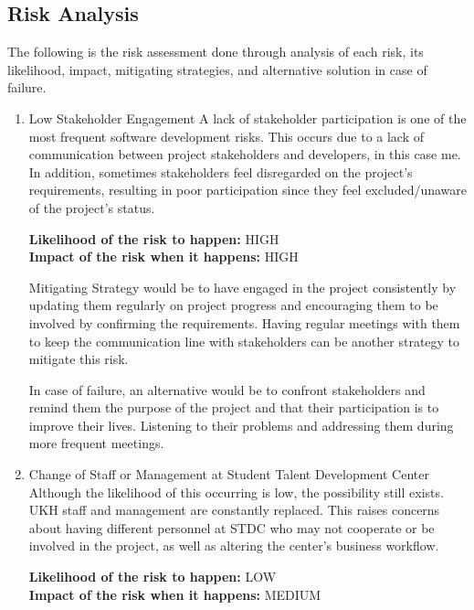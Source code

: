 \subsection{Risk Analysis}
\begin{justify}
The following is the risk assessment done through analysis of each risk, its likelihood, impact, mitigating strategies, and alternative solution in case of failure.

\begin{enumerate}
    \item Low Stakeholder Engagement
    \newendline A lack of stakeholder participation is one of the most frequent software development risks. This occurs due to a lack of communication between project stakeholders and developers, in this case me. In addition, sometimes stakeholders feel disregarded on the project's requirements, resulting in poor participation since they feel excluded/unaware of the project's status.

    \newendline \textbf{\textcolor{vin}{Likelihood of the risk to happen:}} HIGH\\
    \textbf{\textcolor{vin}{Impact of the risk when it happens:}} HIGH

    \newendline Mitigating Strategy would be to have engaged in the project consistently by updating them regularly on project progress and encouraging them to be involved by confirming the requirements. Having regular meetings with them to keep the communication line with stakeholders can be another strategy to mitigate this risk.

    \newendline In case of failure, an alternative would be to confront stakeholders and remind them the purpose of the project and that their participation is to improve their lives. Listening to their problems and addressing them during more frequent meetings.\newendline

    \item Change of Staff or Management at Student Talent Development Center
    \newendline Although the likelihood of this occurring is low, the possibility still exists. UKH staff and management are constantly replaced. This raises concerns about having different personnel at STDC who may not cooperate or be involved in the project, as well as altering the center's business workflow. 

    \newendline \textbf{\textcolor{vin}{Likelihood of the risk to happen:}} LOW\\
    \textbf{\textcolor{vin}{Impact of the risk when it happens:}} MEDIUM


\end{enumerate}
\end{justify}
